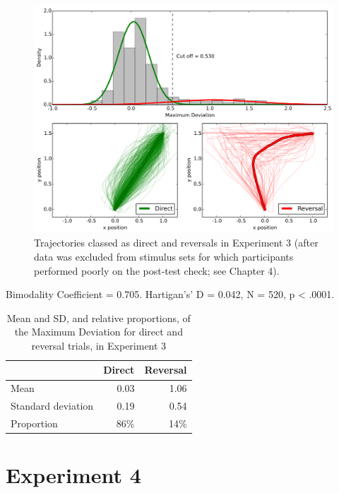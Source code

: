 \begin{figure}[ht]
  \centering
  \includegraphics[width=\textwidth]{imgs/reversals/exp3-reversals}
  \caption[]{
    \label{fig:exp3-reversals}
    Trajectories classed as direct and reversals in Experiment 3
    (after data was excluded from stimulus sets for which participants
    performed poorly on the post-test check; see Chapter 4).
  }
\end{figure}


Bimodality Coefficient = 0.705.
Hartigan's' D = 0.042, N = 520, p < .0001.


\begin{table}[hp]
  \centering
  \caption[]{
    Mean and SD, and relative proportions, of the Maximum Deviation for direct and reversal trials, in Experiment 3
    \label{tab:appendix-reversals-3}
  }
  \begin{tabular}{lrr}
    \toprule
    &   Direct &   Reversal \\
    \midrule
    Mean               &     0.03 &             1.06 \\
    Standard deviation &     0.19 &             0.54 \\
    Proportion         &    86\%    &            14\%    \\
    \bottomrule
  \end{tabular}
\end{table}

\newpage
\FloatBarrier
\section*{Experiment 4}\label{experiment-4}

